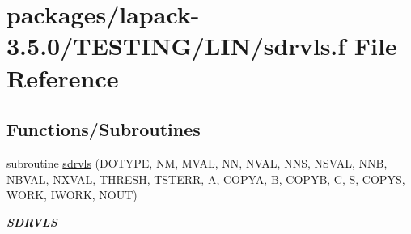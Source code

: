 \hypertarget{sdrvls_8f}{}\section{packages/lapack-\/3.5.0/\+T\+E\+S\+T\+I\+N\+G/\+L\+I\+N/sdrvls.f File Reference}
\label{sdrvls_8f}
\subsection*{Functions/\+Subroutines}
\begin{DoxyCompactItemize}
\item 
subroutine \hyperlink{group__single__lin_gaa320f3dd3a03036eaff38e736f03afb6}{sdrvls} (D\+O\+T\+Y\+P\+E, N\+M, M\+V\+A\+L, N\+N, N\+V\+A\+L, N\+N\+S, N\+S\+V\+A\+L, N\+N\+B, N\+B\+V\+A\+L, N\+X\+V\+A\+L, \hyperlink{zlaqgs_8c_a0656018abfc9fa2821827415f5d5ea57}{T\+H\+R\+E\+S\+H}, T\+S\+T\+E\+R\+R, \hyperlink{classA}{A}, C\+O\+P\+Y\+A, B, C\+O\+P\+Y\+B, C, S, C\+O\+P\+Y\+S, W\+O\+R\+K, I\+W\+O\+R\+K, N\+O\+U\+T)
\begin{DoxyCompactList}\small\item\em {\bfseries S\+D\+R\+V\+L\+S} \end{DoxyCompactList}\end{DoxyCompactItemize}
